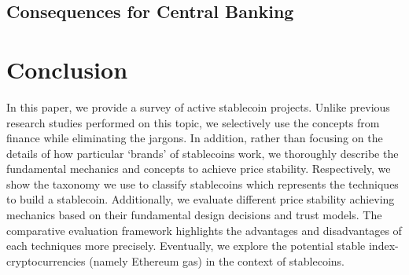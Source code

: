 \subsection{Consequences for Central Banking}


\section{Conclusion}

In this paper, we provide a survey of active stablecoin projects. Unlike previous research studies performed on this topic, we selectively use the concepts from finance while eliminating the jargons. In addition, rather than focusing on the details of how particular `brands' of stablecoins work, we thoroughly describe the fundamental mechanics and concepts to achieve price stability. Respectively, we show the taxonomy we use to classify stablecoins which represents the techniques to build a stablecoin. Additionally, we evaluate different price stability achieving mechanics based on their fundamental design decisions and trust models. The comparative evaluation framework highlights the advantages and disadvantages of each techniques more precisely. Eventually, we explore the potential stable index-cryptocurrencies (namely Ethereum gas) in the context of stablecoins.













